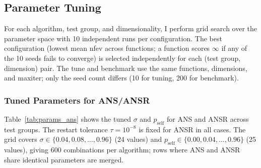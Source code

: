 \documentclass[11pt,a4paper]{article}
\begin{document}
\smallskip
\noindent{}

\subsection{Parameter Tuning}
\label{sec:tuning}

For each algorithm, test group, and dimensionality, I perform grid search over the parameter space with 10 independent runs per configuration. The best configuration (lowest mean nfev across functions; a function scores $\infty$ if any of the 10 seeds fails to converge) is selected independently for each (test group, dimension) pair. The tune and benchmark use the same functions, dimensions, and maxiter; only the seed count differs (10 for tuning, 200 for benchmark).

\subsubsection{Tuned Parameters for ANS/ANSR}

Table~\ref{tab:params_ans} shows the tuned $\sigma$ and $p_{\text{self}}$ for ANS and ANSR across test groups. The restart tolerance $\tau = 10^{-8}$ is fixed for ANSR in all cases. The grid covers $\sigma \in \{0.04, 0.08, \ldots, 0.96\}$ (24 values) and $p_{\text{self}} \in \{0.00, 0.04, \ldots, 0.96\}$ (25 values), giving 600 combinations per algorithm; rows where ANS and ANSR share identical parameters are merged.
\end{document}
